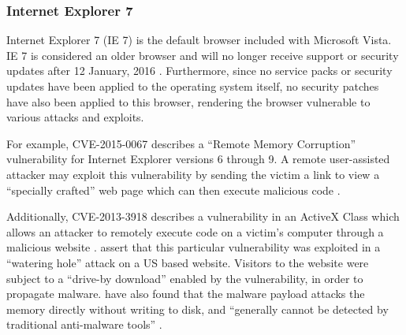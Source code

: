 
\subsubsection{Internet Explorer 7}

Internet Explorer 7 (IE 7) is the default browser included with Microsoft Vista. IE 7 is considered an older browser and will no longer receive support or security updates after 12 January, 2016 \citep{Capriotti2014}. Furthermore, since no service packs or security updates have been applied to the operating system itself, no security patches have also been applied to this browser, rendering the browser vulnerable to various attacks and exploits.

For example, CVE-2015-0067 describes a ``Remote Memory Corruption'' vulnerability for Internet Explorer versions 6 through 9. A remote user-assisted attacker may exploit this vulnerability by sending the victim a link to view a ``specially crafted'' web page which can then execute malicious code \citep{SecurityFocus2015}.

Additionally, CVE-2013-3918 describes a vulnerability in an ActiveX Class which allows an attacker to remotely execute code on a victim's computer through a malicious website \citep{Ozkan2013, Microsoft2013}. \citet{Chen2013} assert that this particular vulnerability was exploited in a ``watering hole'' attack on a US based website. Visitors to the website were subject to a ``drive-by download'' enabled by the vulnerability, in order to propagate malware. \citet{Moran2013} have also found that the malware payload attacks the memory directly without writing to disk, and ``generally cannot be detected by traditional anti-malware tools'' \citep{Wilson2013}.


